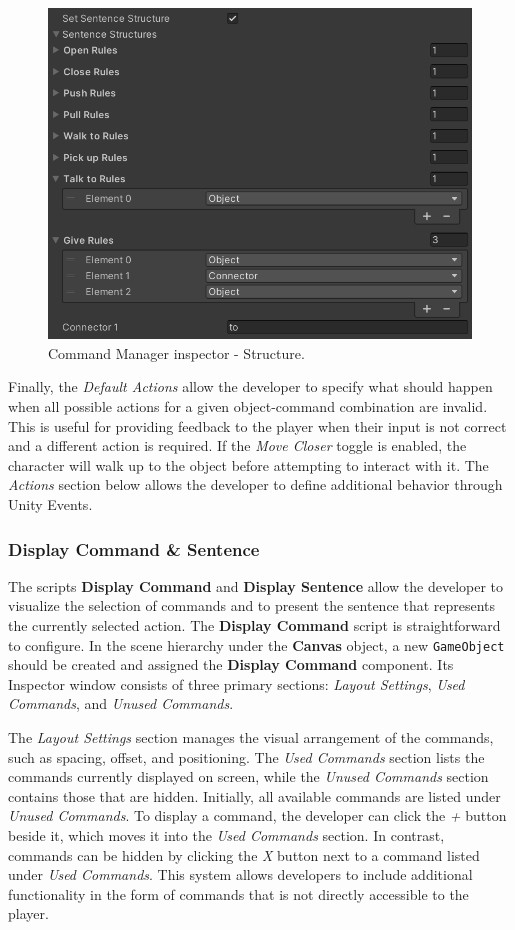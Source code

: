 \begin{figure}[H]
\centering
\includegraphics[width=.8\linewidth]{img/User doc/image_2025-07-04_203654317.png}
\caption{Command Manager inspector - Structure.}
\label{fig:Manual-CM3}
\end{figure}

Finally, the \textit{Default Actions} allow the developer to specify what should happen when all possible actions for a given object-command combination are invalid. This is useful for providing feedback to the player when their input is not correct and a different action is required. If the \textit{Move Closer} toggle is enabled, the character will walk up to the object before attempting to interact with it. The \textit{Actions} section below allows the developer to define additional behavior through Unity Events.

\subsubsection{Display Command \& Sentence }
\label{Manual:Display-C&S}
The scripts \textbf{Display Command} and \textbf{Display Sentence} allow the developer to visualize the selection of commands and to present the sentence that represents the currently selected action. The \textbf{Display Command} script is straightforward to configure. In the scene hierarchy under the \textbf{Canvas} object, a new \verb|GameObject| should be created and assigned the \textbf{Display Command} component. Its Inspector window consists of three primary sections: \textit{Layout Settings}, \textit{Used Commands}, and \textit{Unused Commands}.

The \textit{Layout Settings} section manages the visual arrangement of the commands, such as spacing, offset, and positioning. The \textit{Used Commands} section lists the commands currently displayed on screen, while the \textit{Unused Commands} section contains those that are hidden. Initially, all available commands are listed under \textit{Unused Commands}. To display a command, the developer can click the \textit{+} button beside it, which moves it into the \textit{Used Commands} section. In contrast, commands can be hidden by clicking the \textit{X} button next to a command listed under \textit{Used Commands}. This system allows developers to include additional functionality in the form of commands that is not directly accessible to the player.

